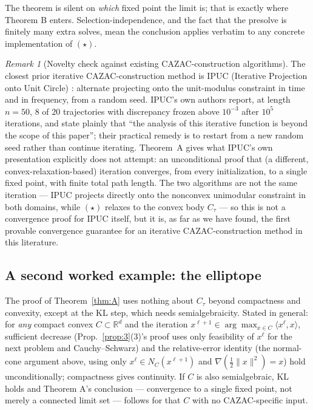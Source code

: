 \documentclass[11pt]{article}
\theoremstyle{plain}
\theoremstyle{definition}
\theoremstyle{remark}
\newtheorem{remark}[theorem]{Remark}
\newcommand{\R}{\mathbb R}
\begin{document}
The theorem is silent on \emph{which} fixed point the limit is; that is
exactly where Theorem B enters. Selection-independence, and the fact that
the presolve is finitely many extra solves, mean the conclusion applies
verbatim to any concrete implementation of $(\star)$.

\begin{remark}[Novelty check against existing CAZAC-construction
algorithms]
The closest prior iterative CAZAC-construction method is IPUC (Iterative
Projection onto Unit Circle) \cite{Amis25}: alternate projecting onto the
unit-modulus constraint in time and in frequency, from a random seed.
IPUC's own authors report, at length $n=50$, $8$ of $20$ trajectories
with discrepancy frozen above $10^{-3}$ after $10^5$ iterations, and
state plainly that ``the analysis of this iterative function is beyond
the scope of this paper''; their practical remedy is to restart from a
new random seed rather than continue iterating. Theorem~A gives what
IPUC's own presentation explicitly does not attempt: an unconditional
proof that (a different, convex-relaxation-based) iteration converges,
from every initialization, to a single fixed point, with finite total
path length. The two algorithms are not the same iteration --- IPUC
projects directly onto the nonconvex unimodular constraint in both
domains, while $(\star)$ relaxes to the convex body $C_\tau$ --- so this
is not a convergence proof for IPUC itself, but it is, as far as we have
found, the first provable convergence guarantee for an iterative
CAZAC-construction method in this literature.
\end{remark}

\subsection{A second worked example: the elliptope}\label{sec:elliptope}

The proof of Theorem~\ref{thm:A} uses nothing about $C_\tau$ beyond
compactness and convexity, except at the KL step, which needs
semialgebraicity. Stated in general: for \emph{any} compact convex
$C\subset\R^d$ and the iteration
$x^{\ell+1}\in\arg\max_{x\in C}\langle x^\ell,x\rangle$, sufficient decrease
(Prop.~\ref{prop:3}(3)'s proof uses only feasibility of $x^\ell$ for the
next problem and Cauchy--Schwarz) and the relative-error identity (the
normal-cone argument above, using only $x^\ell\in N_C(x^{\ell+1})$ and
$\nabla(\tfrac12\|x\|^2)=x$) hold unconditionally; compactness gives
continuity. If $C$ is also semialgebraic, KL holds \cite{BDLS07} and
Theorem A's conclusion --- convergence to a single fixed point, not merely a
connected limit set --- follows for that $C$ with no CAZAC-specific input.
\end{document}
